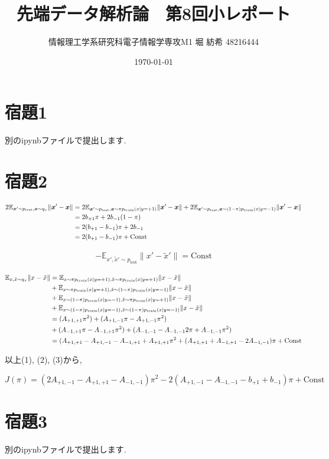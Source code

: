 \documentclass[a4paper,11pt]{jsarticle}
\begin{document}
  \title{先端データ解析論　第8回小レポート}
  \author{情報理工学系研究科電子情報学専攻M1 堀 紡希 48216444}
  \date{\today}
  \maketitle
  \section*{宿題1}
  別のipynbファイルで提出します.
  \section*{宿題2}
  \begin{align}
    2{\mathbb E} _{{\bm x}' \sim p_\text{test}, {\bm x}\sim q_\pi} \|{\bm x}' - {\bm x}\| &= 
    2{\mathbb E} _{{\bm x}' \sim p_\text{test}, {\bm x}\sim \pi p_\text{train} (x|y=+1)} \|{\bm x}' - {\bm x}\| +
    2{\mathbb E} _{{\bm x}' \sim p_\text{test}, {\bm x}\sim (1-\pi)p_\text{train} (x|y=-1)} \|{\bm x}' - {\bm x}\| \notag \\
    &= 2b_{+1}\pi + 2b_{-1}(1-\pi) \notag\\
    &= 2(b_{+1}-b_{-1})\pi +2b_{-1} \notag\\
    &= 2(b_{+1}-b_{-1})\pi + \text{Const}
  \end{align}

  \begin{align}
    -{\mathbb E} _{x', \tilde{x}' \sim p_\text{test}} \|x'-\tilde{x}'\| = \text{Const} 
  \end{align}

  \begin{align}
    {\mathbb E} _{x, \tilde{x} \sim q_\pi} \|x-\tilde{x}\|
    &= {\mathbb E}_{x\sim \pi p_\text{train} (x|y=+1), \tilde{x} \sim \pi p_\text{train} (x|y=+1)}\|x-\tilde{x}\|\notag\\
    &+ {\mathbb E}_{x\sim \pi p_\text{train} (x|y=+1), \tilde{x} \sim (1-\pi) p_\text{train} (x|y=-1)}\|x-\tilde{x}\|\notag\\
    &+ {\mathbb E}_{x\sim (1-\pi) p_\text{train} (x|y=-1), \tilde{x} \sim \pi p_\text{train} (x|y=+1)}\|x-\tilde{x}\|\notag\\
    &+ {\mathbb E}_{x\sim (1-\pi) p_\text{train} (x|y=-1), \tilde{x} \sim (1-\pi) p_\text{train} (x|y=-1)}\|x-\tilde{x}\|\notag\\
    &= (A_{+1, +1}\pi^2) + (A_{+1, -1}\pi -A_{+1,-1}\pi^2)\notag\\
    &+ (A_{-1, +1}\pi -A_{-1, +1}\pi^2) + (A_{-1, -1}-A_{-1, -1}2\pi + A_{-1, -1}\pi^2)\notag\\
    &= (A_{+1,+1}-A_{+1,-1}-A_{-1,+1}+A_{+1,+1}\pi^2 + (A_{+1,+1}+A_{-1,+1}-2A_{-1, -1})\pi + \text{Const}
  \end{align}

  以上(1), (2), (3)から, 

  \begin{equation}
    J(\pi) = (2A_{+1,-1}-A_{+1,+1}-A_{-1,-1})\pi^2 -2(A_{+1,-1}-A_{-1,-1}-b_{+1}+b_{-1})\pi + \text{Const}
  \end{equation}
  \section*{宿題3}
  別のipynbファイルで提出します.
\end{document}
